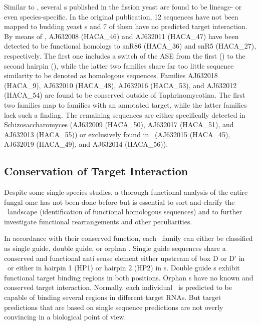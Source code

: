 Similar to \calb, several \sno s published in the fission yeast
\cite{Li:2005} are found to be lineage- or even species-specific. In the
original publication, 12 sequences have not been mapped to budding yeast
\sno s and 7 of them have no predicted target interaction. By means of
\snostrip, AJ632008 (HACA\_46) and AJ632011 (HACA\_47) have been detected
to be functional homologs to snR86 (HACA\_36) and snR5 (HACA\_27),
respectively. The first one includes a switch of the ASE from the first
(\spo) to the second hairpin (\sce), while the latter two families share
far too little sequence similarity to be denoted as homologous
sequences. Families AJ632018 (HACA\_9), AJ632010 (HACA\_48), AJ632016
(HACA\_53), and AJ632012 (HACA\_54) are found to be conserved outside of
Taphrinomycotina. The first two families map to families with an annotated
target, while the latter families lack such a finding. The remaining
sequences are either specifically detected in Schizosaccharomyces (AJ632009
(HACA\_50), AJ632017 (HACA\_51), and AJ632013 (HACA\_55)) or exclusively
found in \spo\ (AJ632015 (HACA\_45), AJ632019 (HACA\_49), and AJ632014
(HACA\_56)).

\subsection{Conservation of Target Interaction}

Despite some single-species studies, a thorough functional analysis of the
entire fungal \sno ome has not been done before but is essential to sort
and clarify the \sno\ landscape (identification of functional homologous
sequences) and to further investigate functional rearrangements and other
peculiarities.

In accordance with their conserved function, each \sno\ family can either
be classified as single guide, double guide, or orphan \sno. Single guide
sequences share a conserved and functional anti sense element either
upstream of box D or D' in \cd\ or either in hairpin 1 (HP1) or hairpin 2
(HP2) in \haca s. Double guide \sno s exhibit functional target binding
regions in both positions. Orphan \sno s have no known and conserved target
interaction. Normally, each individual \sno\ is predicted to be capable of
binding several regions in different target RNAs. But target predictions
that are based on single sequence predictions are not overly convincing in
a biological point of view.

